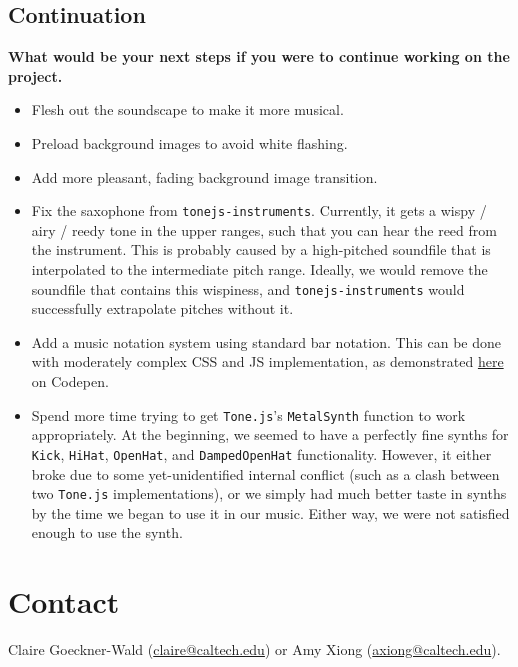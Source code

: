 \documentclass[12pt,a4paper]{article}
\newcommand{\code}{\texttt}
\newcommand{\lightcode}[1]{\colorbox{light-gray}{\texttt{#1}}}
\begin{document}
\subsection{Continuation}
\textbf{What would be your next steps if you were to continue working on the project.}
\begin{itemize}
	\item Flesh out the soundscape to make it more musical.
	\item Preload background images to avoid white flashing.
	\item Add more pleasant, fading background image transition.
	\item Fix the saxophone from \lightcode{tonejs-instruments}. Currently, it gets a wispy / airy / reedy tone in the upper ranges, such that you can hear the reed from the instrument. This is probably caused by a high-pitched soundfile that is interpolated to the intermediate pitch range. Ideally, we would remove the soundfile that contains this wispiness, and \lightcode{tonejs-instruments} would successfully extrapolate pitches without it.
	\item Add a music notation system using standard bar notation. This can be done with moderately complex CSS and JS implementation, as demonstrated \href{https://codepen.io/laviperchik/pen/mIACq}{here} on Codepen. \cite{css-musical-notes}
	\item Spend more time trying to get \lightcode{Tone.js}'s \code{MetalSynth} function to work appropriately. At the beginning, we seemed to have a perfectly fine synths for \code{Kick}, \code{HiHat}, \code{OpenHat}, and \code{DampedOpenHat} functionality. However, it either broke due to some yet-unidentified internal conflict (such as a clash between two \lightcode{Tone.js} implementations), or we simply had much better taste in synths by the time we began to use it in our music. Either way, we were not satisfied enough to use the synth.
\end{itemize}

\section{Contact}

Claire Goeckner-Wald (\href{mailto://claire@caltech.edu}{claire@caltech.edu}) or Amy Xiong (\href{mailto://axiong@caltech.edu}{axiong@caltech.edu}).
\end{document}
